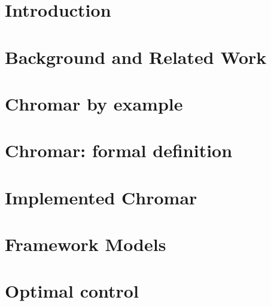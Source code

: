 \documentclass[phd, logo, twoside]{infthesis}
\begin{document}
\begin{preliminary}
\begin{acknowledgements}
    \end{acknowledgements}

\standarddeclaration


\tableofcontents


\end{preliminary}

\chapter{Introduction}
\label{chp:intro}


\chapter{Background and Related Work}
\label{chp:relWork}


\chapter{Chromar by example}
\label{chp:chromarEx}


\chapter{Chromar: formal definition}
\label{chp:chromarForm}


\chapter{Implemented Chromar}
\label{chp:chromarImpl}


\chapter{Framework Models}
\label{chp:fms}


\chapter{Optimal control}
\label{chp:oc}

\end{document}
